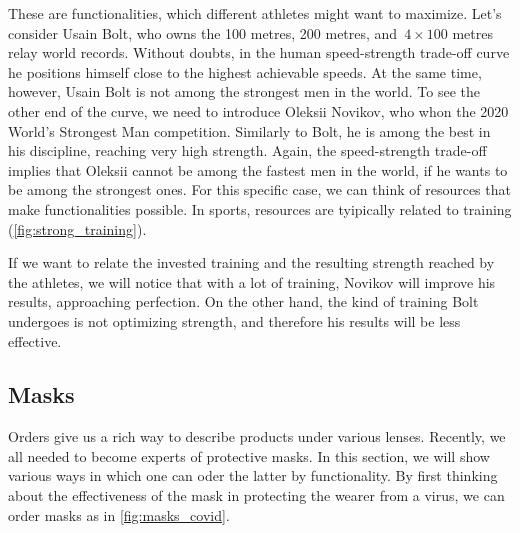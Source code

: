 \begin{marginfigure}
    \centering
    \caption{}
    \label{fig:fast_strong}
\end{marginfigure}

These are functionalities, which different athletes might want to maximize.
Let's consider Usain Bolt, who owns the 100 metres, 200 metres, and~$4\times 100$ metres relay world records.
Without doubts, in the human speed-strength trade-off curve he positions himself close to the highest achievable speeds.
At the same time, however, Usain Bolt is not among the strongest men in the world.
To see the other end of the curve, we need to introduce Oleksii Novikov, who whon the 2020 World's Strongest Man competition.
Similarly to Bolt, he is among the best in his discipline, reaching very high strength.
Again, the speed-strength trade-off implies that Oleksii cannot be among the fastest men in the world, if he wants to be among the strongest ones.
For this specific case, we can think of resources that make functionalities possible.
In sports, resources are tyipically related to training (\cref{fig:strong_training}).

\begin{marginfigure}
    \centering
    \caption{}
    \label{fig:strong_training}
\end{marginfigure}

If we want to relate the invested training and the resulting strength reached by the athletes, we will notice that with a lot of training, Novikov will improve his results, approaching perfection.
On the other hand, the kind of training Bolt undergoes is not optimizing strength, and therefore his results will be less effective.


\subsection{Masks}

Orders give us a rich way to describe products under various lenses.
Recently, we all needed to become experts of protective masks.
In this section, we will show various ways in which one can oder the latter by functionality.
By first thinking about the effectiveness of the mask in protecting the wearer from a virus, we can order masks as in \cref{fig:masks_covid}.

